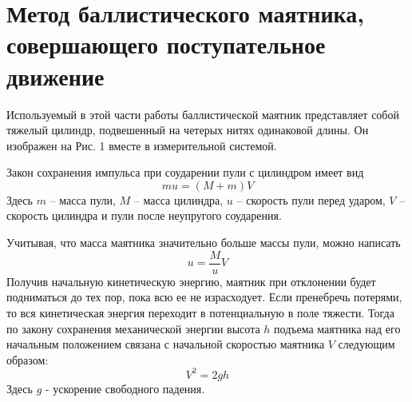 \documentclass[a4paper,12pt]{article} %
\begin{document}
\section{Метод баллистического маятника, совершающего поступательное движение}
Используемый в этой части работы баллистической маятник представляет собой тяжелый цилиндр, подвешенный на четерых нитях одинаковой длины. Он изображен на Рис. 1 вместе в измерительной системой.

Закон сохранения импульса при соударении пули с цилиндром имеет вид
\begin{equation}
mu = (M+m)V
\end{equation}
Здесь $m$ -- масса пули, $M$ -- масса цилиндра, $u$ -- скорость пули перед ударом, $V$ -- скорость цилиндра и пули после неупругого соударения.

Учитывая, что масса маятника значительно больше массы пули, можно написать
\begin{equation}
u = \frac{M}{u}V
\end{equation}
Получив начальную кинетическую энергию, маятник при отклонении будет подниматься до тех пор, пока всю ее не израсходует. Если пренебречь потерями, то вся кинетическая энергия переходит в потенциальную в поле тяжести. Тогда по закону сохранения механической энергии высота $h$ подъема маятника над его начальным положением связана с начальной скоростью маятника $V$ следующим образом:
\begin{equation}
V^2=2gh
\end{equation}
Здесь $g$ - ускорение свободного падения.
\end{document}
